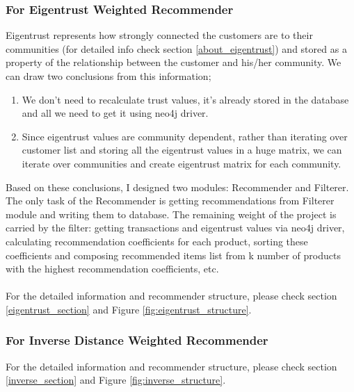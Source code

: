 \subsubsection{For Eigentrust Weighted Recommender}
Eigentrust represents how strongly connected the customers are to their communities (for detailed info check section \ref{about_eigentrust}) and stored as a property of the relationship between the customer and his/her community. We can draw two conclusions from this information;
\begin{enumerate}
	\item We don't need to recalculate trust values, it's already stored in the database and all we need to get it using neo4j driver.
	\item Since eigentrust values are community dependent, rather than iterating over customer list and storing all the eigentrust values in a huge matrix, we can iterate over communities and create eigentrust matrix for each community.
\end{enumerate}
Based on these conclusions, I designed two modules: Recommender and Filterer. The only task of the Recommender is getting recommendations from Filterer module and writing them to database.  The remaining weight of the project is carried by the filter: getting transactions and eigentrust values via neo4j driver, calculating recommendation coefficients for each product, sorting these coefficients and composing recommended items list from k number of products with the highest recommendation coefficients, etc. \\ \\
For the detailed information and recommender structure, please check section \ref{eigentrust_section} and Figure \ref{fig:eigentrust_structure}.
\subsubsection{For Inverse Distance Weighted Recommender}
For the detailed information and recommender structure, please check section \ref{inverse_section} and Figure \ref{fig:inverse_structure}.